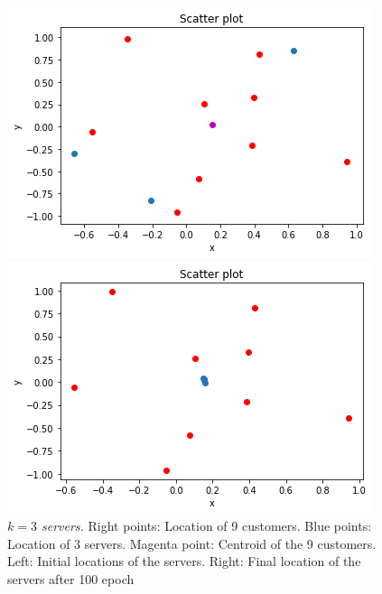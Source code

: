 \documentclass{article}
\begin{document}
\begin{figure}[!ht]
	\begin{minipage}{0.5\linewidth}
		\centering
		\includegraphics[scale=0.3]{3s0}
	\end{minipage}%
	\begin{minipage}{0.5\linewidth}
		\centering
		\includegraphics[scale=0.3]{3s10}
	\end{minipage}%
	\caption{\textit{$k=3$ servers.} Right points: Location of 9 customers. Blue points: Location of 3 servers. Magenta point: Centroid of the 9 customers. Left: Initial locations of the servers. Right: Final location of the servers after 100 epoch}
	\label{fig:3s}
\end{figure}
\end{document}
